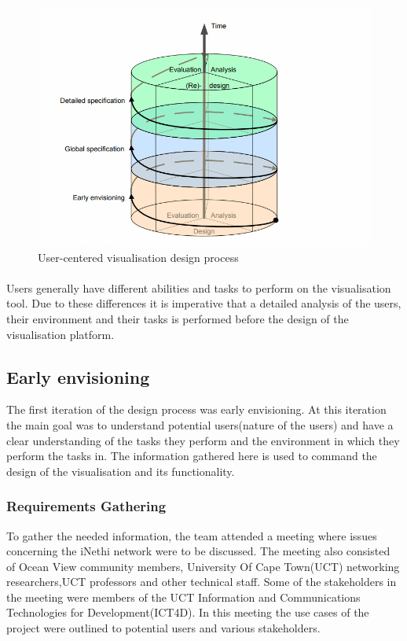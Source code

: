 \paragraph{}
\begin{figure}[b]
	\centering
	\includegraphics[width=0.7\linewidth]{images/img1}
	\caption{User-centered visualisation design process\cite{Abras04user-centereddesign}}
	\label{fig:img1}
\end{figure}

\paragraph{}
Users generally have different abilities and tasks to perform on the visualisation tool. Due to these differences it is imperative that a detailed analysis of the users, their environment and their tasks is performed before the design of the visualisation platform.

\subsection{Early envisioning}
The first iteration of the design process was early envisioning. At this iteration the main goal was to understand potential users(nature of the users) and have a clear understanding of the tasks they perform and the environment in which they perform the tasks in\cite{Valiati:2006:TTG:1168149.1168169}. The information gathered here is used to command the design of the visualisation and its functionality.

\subsubsection{Requirements Gathering}
To gather the needed information, the team attended a meeting where issues concerning the iNethi network were to be discussed. The meeting also consisted of Ocean View community members, University Of Cape Town(UCT) networking researchers,UCT professors and other technical staff. Some of the stakeholders in the meeting were members of the UCT Information and Communications Technologies for Development(ICT4D). In this meeting the use cases of the project were outlined to potential users and various stakeholders.
